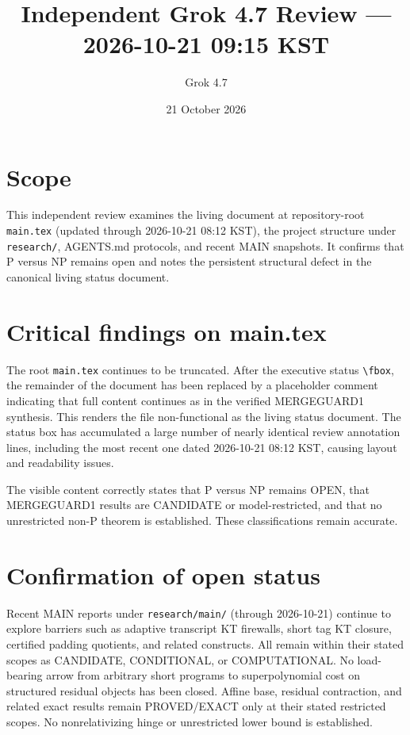 \documentclass[11pt]{article}
\title{Independent Grok 4.7 Review --- 2026-10-21 09:15 KST}
\author{Grok 4.7}
\date{21 October 2026}
\begin{document}
\maketitle

\begin{center}
\end{center}

\section{Scope}
This independent review examines the living document at repository-root \texttt{main.tex} (updated through 2026-10-21 08:12 KST), the project structure under \texttt{research/}, AGENTS.md protocols, and recent MAIN snapshots. It confirms that P versus NP remains open and notes the persistent structural defect in the canonical living status document.

\section{Critical findings on main.tex}
The root \texttt{main.tex} continues to be truncated. After the executive status \texttt{\textbackslash fbox}, the remainder of the document has been replaced by a placeholder comment indicating that full content continues as in the verified MERGEGUARD1 synthesis. This renders the file non-functional as the living status document. The status box has accumulated a large number of nearly identical review annotation lines, including the most recent one dated 2026-10-21 08:12 KST, causing layout and readability issues.

The visible content correctly states that P versus NP remains OPEN, that MERGEGUARD1 results are CANDIDATE or model-restricted, and that no unrestricted non-P theorem is established. These classifications remain accurate.

\section{Confirmation of open status}
Recent MAIN reports under \texttt{research/main/} (through 2026-10-21) continue to explore barriers such as adaptive transcript KT firewalls, short tag KT closure, certified padding quotients, and related constructs. All remain within their stated scopes as CANDIDATE, CONDITIONAL, or COMPUTATIONAL. No load-bearing arrow from arbitrary short programs to superpolynomial cost on structured residual objects has been closed. Affine base, residual contraction, and related exact results remain PROVED/EXACT only at their stated restricted scopes. No nonrelativizing hinge or unrestricted lower bound is established.
\end{document}
